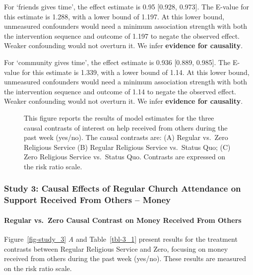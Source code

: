 \documentclass[
  single column]{article}
\let\oldparagraph\paragraph
\renewcommand{\paragraph}[1]{\oldparagraph{#1}\mbox{}}
\begin{document}
For `friends gives time', the effect estimate is 0.95 {[}0.928,
0.973{]}. The E-value for this estimate is 1.288, with a lower bound of
1.197. At this lower bound, unmeasured confounders would need a minimum
association strength with both the intervention sequence and outcome of
1.197 to negate the observed effect. Weaker confounding would not
overturn it. We infer \textbf{evidence for causality}.

For `community gives time', the effect estimate is 0.936 {[}0.889,
0.985{]}. The E-value for this estimate is 1.339, with a lower bound of
1.14. At this lower bound, unmeasured confounders would need a minimum
association strength with both the intervention sequence and outcome of
1.14 to negate the observed effect. Weaker confounding would not
overturn it. We infer \textbf{evidence for causality}.

\begin{figure}


\caption{\label{fig-study2}This figure reports the results of model
estimates for the three causal contrasts of interest on help received
from others during the past week (yes/no). The causal contrasts are: (A)
Regular vs.~Zero Religious Service (B) Regular Religious Service
vs.~Status Quo; (C) Zero Religious Service vs.~Status Quo. Contrasts are
expressed on the risk ratio scale.}

\end{figure}%

\newpage{}

\subsubsection{Study 3: Causal Effects of Regular Church Attendance on
Support Received From Others --
Money}\label{study-3-causal-effects-of-regular-church-attendance-on-support-received-from-others-money}

\paragraph{Regular vs.~Zero Causal Contrast on Money Received From
Others}\label{regular-vs.-zero-causal-contrast-on-money-received-from-others}

Figure~\ref{fig-study_3} \emph{A} and Table~\ref{tbl-3_1} present
results for the treatment contrasts between Regular Religious Service
and Zero, focusing on money received from others during the past week
(yes/no). These results are measured on the risk ratio scale.
\end{document}
